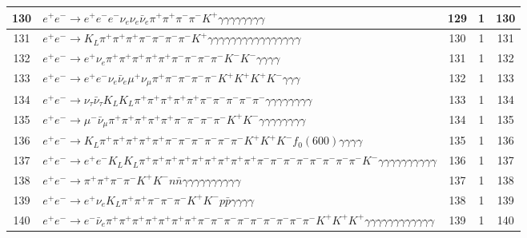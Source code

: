 \documentclass[landscape]{article}
\begin{document}
\begin{table}[htbp!]
\begin{tabular}{|c|>{\centering}p{18cm}|c|c|c|}
\hline
130 & $ e^{+} e^{-} \rightarrow e^{+} e^{-} e^{-} \nu_{e} \nu_{e} \bar{\nu}_{e} \pi^{+} \pi^{+} \pi^{-} \pi^{-} K^{+} \gamma \gamma \gamma \gamma \gamma \gamma \gamma \gamma $ & 129 & 1 & 130 \\
\hline
131 & $ e^{+} e^{-} \rightarrow K_{L} \pi^{+} \pi^{+} \pi^{+} \pi^{-} \pi^{-} \pi^{-} \pi^{-} K^{+} \gamma \gamma \gamma \gamma \gamma \gamma \gamma \gamma \gamma \gamma \gamma \gamma \gamma \gamma \gamma \gamma $ & 130 & 1 & 131 \\
\hline
132 & $ e^{+} e^{-} \rightarrow e^{+} \nu_{e} \pi^{+} \pi^{+} \pi^{+} \pi^{+} \pi^{+} \pi^{-} \pi^{-} \pi^{-} \pi^{-} K^{-} K^{-} \gamma \gamma \gamma \gamma $ & 131 & 1 & 132 \\
\hline
133 & $ e^{+} e^{-} \rightarrow e^{+} e^{-} \nu_{e} \bar{\nu}_{e} \mu^{+} \nu_{\mu} \pi^{+} \pi^{-} \pi^{-} \pi^{-} \pi^{-} K^{+} K^{+} K^{+} K^{-} \gamma \gamma \gamma $ & 132 & 1 & 133 \\
\hline
134 & $ e^{+} e^{-} \rightarrow \nu_{\tau} \bar{\nu}_{\tau} K_{L} K_{L} \pi^{+} \pi^{+} \pi^{+} \pi^{+} \pi^{+} \pi^{-} \pi^{-} \pi^{-} \pi^{-} \pi^{-} \gamma \gamma \gamma \gamma \gamma \gamma \gamma \gamma $ & 133 & 1 & 134 \\
\hline
135 & $ e^{+} e^{-} \rightarrow \mu^{-} \bar{\nu}_{\mu} \pi^{+} \pi^{+} \pi^{+} \pi^{+} \pi^{+} \pi^{-} \pi^{-} \pi^{-} \pi^{-} K^{+} K^{-} \gamma \gamma \gamma \gamma \gamma \gamma \gamma \gamma $ & 134 & 1 & 135 \\
\hline
136 & $ e^{+} e^{-} \rightarrow K_{L} \pi^{+} \pi^{+} \pi^{+} \pi^{+} \pi^{+} \pi^{-} \pi^{-} \pi^{-} \pi^{-} \pi^{-} \pi^{-} K^{+} K^{+} K^{-} f_{0}(600) \gamma \gamma \gamma \gamma $ & 135 & 1 & 136 \\
\hline
137 & $ e^{+} e^{-} \rightarrow e^{+} e^{-} K_{L} K_{L} \pi^{+} \pi^{+} \pi^{+} \pi^{+} \pi^{+} \pi^{+} \pi^{+} \pi^{+} \pi^{+} \pi^{-} \pi^{-} \pi^{-} \pi^{-} \pi^{-} \pi^{-} \pi^{-} \pi^{-} K^{-} \gamma \gamma \gamma \gamma \gamma \gamma \gamma \gamma \gamma \gamma $ & 136 & 1 & 137 \\
\hline
138 & $ e^{+} e^{-} \rightarrow \pi^{+} \pi^{+} \pi^{-} \pi^{-} K^{+} K^{-} n \bar{n} \gamma \gamma \gamma \gamma \gamma \gamma \gamma \gamma \gamma \gamma $ & 137 & 1 & 138 \\
\hline
139 & $ e^{+} e^{-} \rightarrow e^{+} \nu_{e} K_{L} \pi^{+} \pi^{+} \pi^{-} \pi^{-} \pi^{-} K^{+} K^{-} p \bar{p} \gamma \gamma \gamma \gamma $ & 138 & 1 & 139 \\
\hline
140 & $ e^{+} e^{-} \rightarrow e^{-} \bar{\nu}_{e} \pi^{+} \pi^{+} \pi^{+} \pi^{+} \pi^{+} \pi^{+} \pi^{+} \pi^{-} \pi^{-} \pi^{-} \pi^{-} \pi^{-} \pi^{-} \pi^{-} \pi^{-} \pi^{-} K^{+} K^{+} K^{+} \gamma \gamma \gamma \gamma \gamma \gamma \gamma \gamma \gamma \gamma \gamma \gamma $ & 139 & 1 & 140 \\

\end{tabular}
\end{table}
\end{document}
